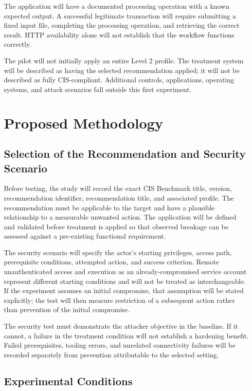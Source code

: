 \documentclass[12pt,letterpaper]{article}
\begin{document}
The application will have a documented processing operation with a known expected output. A successful legitimate transaction will require submitting a fixed input file, completing the processing operation, and retrieving the correct result. HTTP availability alone will not establish that the workflow functions correctly.

The pilot will not initially apply an entire Level 2 profile. The treatment system will be described as having the selected recommendation applied; it will not be described as fully CIS-compliant. Additional controls, applications, operating systems, and attack scenarios fall outside this first experiment.
\section{Proposed Methodology}
\label{sec:org841eefc}

\subsection{Selection of the Recommendation and Security Scenario}
\label{sec:org3cb4f89}

Before testing, the study will record the exact CIS Benchmark title, version, recommendation identifier, recommendation title, and associated profile. The recommendation must be applicable to the target and have a plausible relationship to a measurable unwanted action. The application will be defined and validated before treatment is applied so that observed breakage can be assessed against a pre-existing functional requirement.

The security scenario will specify the actor's starting privileges, access path, prerequisite conditions, attempted action, and success criterion. Remote unauthenticated access and execution as an already-compromised service account represent different starting conditions and will not be treated as interchangeable. If the experiment assumes an initial compromise, that assumption will be stated explicitly; the test will then measure restriction of a subsequent action rather than prevention of the initial compromise.

The security test must demonstrate the attacker objective in the baseline. If it cannot, a failure in the treatment condition will not establish a hardening benefit. Failed prerequisites, tooling errors, and unrelated connectivity failures will be recorded separately from prevention attributable to the selected setting.
\subsection{Experimental Conditions}
\label{sec:org2198010}
\end{document}

